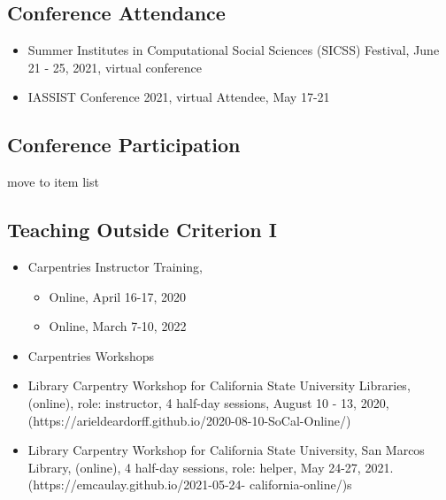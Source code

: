 \subsection{Conference Attendance}

\begin{itemize}[label={},leftmargin=!,labelindent=5pt,itemindent=-15pt]
\item Summer Institutes in Computational Social Sciences (SICSS) Festival,  June 21 - 25, 2021, virtual conference
\item  IASSIST Conference 2021, virtual Attendee, May 17-21 

\end{itemize}


\subsection{Conference Participation}

\nocite{*}
\printbibliography[keyword={outlib-conf-part},title={Conference Participation},heading=none]
\todo move to item list 


%
\subsection{Teaching Outside Criterion I}
\begin{itemize}[label={},leftmargin=!,labelindent=5pt,itemindent=-15pt]
\item Carpentries Instructor Training, 
  \begin{itemize}
    \item Online,  April 16-17, 2020  
\item  Online,  March 7-10, 2022 
  \end{itemize}
  \item Carpentries Workshops
\item Library Carpentry Workshop for California State University Libraries, (online),
role: instructor, 4 half-day sessions, August 10 - 13, 2020,
(https://arieldeardorff.github.io/2020-08-10-SoCal-Online/)
\item Library Carpentry Workshop for California State University, San Marcos Library, (online), 4 half-day sessions, role: helper, May 24-27, 2021. (https://emcaulay.github.io/2021-05-24-
california-online/)s
  \begin{itemize}
  \end{itemize}
\end{itemize}

